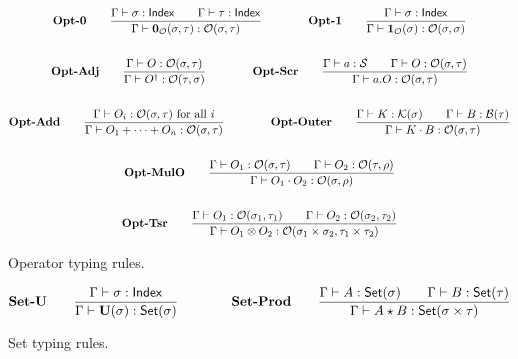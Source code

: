 \documentclass{article}
\begin{document}
\begin{figure}[h]
    \begin{gather*}
        \textbf{Opt-0} \qquad
        \frac{\Gamma \vdash \sigma : \mathsf{Index} \qquad \Gamma \vdash \tau : \mathsf{Index}}{\Gamma \vdash \mathbf{0}_\mathcal{O}(\sigma, \tau) : \mathcal{O}(\sigma, \tau)} 
        \qquad \qquad
        \textbf{Opt-1} \qquad
        \frac{\Gamma \vdash \sigma : \mathsf{Index}}{\Gamma \vdash \mathbf{1}_\mathcal{O}(\sigma) : \mathcal{O}(\sigma, \sigma)} \\
        \\
        \textbf{Opt-Adj} \qquad
        \frac{\Gamma \vdash O : \mathcal{O}(\sigma, \tau)}{\Gamma \vdash O^\dagger : \mathcal{O}(\tau, \sigma)} 
        \qquad \qquad
        \textbf{Opt-Scr} \qquad
        \frac{\Gamma \vdash a : \mathcal{S} \qquad \Gamma \vdash O : \mathcal{O}(\sigma, \tau)}{\Gamma \vdash a.O : \mathcal{O}(\sigma, \tau)} \\
        \\
        \textbf{Opt-Add} \qquad
        \frac{\Gamma \vdash O_i : \mathcal{O}(\sigma, \tau) \text{ for all $i$}}{\Gamma \vdash O_1 + \cdots + O_n : \mathcal{O}(\sigma, \tau)}
        \qquad \qquad
        \textbf{Opt-Outer} \qquad
        \frac{\Gamma\vdash K : \mathcal{K}(\sigma) \qquad \Gamma\vdash B : \mathcal{B}(\tau)}{\Gamma\vdash K \cdot B : \mathcal{O}(\sigma, \tau)} \\
        \\
        \textbf{Opt-MulO} \qquad
        \frac{\Gamma \vdash O_1 : \mathcal{O}(\sigma, \tau) \qquad \Gamma \vdash O_2 : \mathcal{O}(\tau, \rho)}{\Gamma \vdash O_1 \cdot O_2 : \mathcal{O}(\sigma, \rho)} \\
        \\
        \textbf{Opt-Tsr} \qquad
        \frac{\Gamma \vdash O_1 : \mathcal{O}(\sigma_1, \tau_1) \qquad \Gamma \vdash O_2 : \mathcal{O}(\sigma_2, \tau_2)} {\Gamma \vdash O_1 \otimes O_2 : \mathcal{O}(\sigma_1 \times \sigma_2, \tau_1 \times \tau_2)}
    \end{gather*}
    \caption{Operator typing rules.}
\end{figure}


\begin{figure}[h]
    \begin{gather*}
        \textbf{Set-U} \qquad
        \frac{\Gamma \vdash \sigma : \mathsf{Index}}{\Gamma \vdash \mathbf{U}(\sigma) : \mathsf{Set}(\sigma)} 
        \qquad \qquad
        \textbf{Set-Prod} \qquad
        \frac{\Gamma \vdash A : \mathsf{Set}(\sigma) \qquad \Gamma \vdash B : \mathsf{Set}(\tau)}{\Gamma \vdash A \star B : \mathsf{Set}(\sigma \times \tau)}
    \end{gather*}
    \caption{Set typing rules.}
\end{figure}
\end{document}
